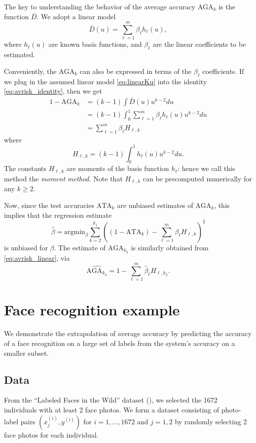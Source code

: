 \documentclass[twoside,11pt]{article}
\newcommand{\argmin}{\text{argmin}}
\begin{document}
The key to understanding the behavior of the average accuracy $\text{AGA}_k$ is the function $\bar{D}$.  
We adopt a linear model
\begin{equation}\label{eq:linearKu}
\bar{D}(u) = \sum_{\ell = 1}^m \beta_\ell h_\ell(u),
\end{equation}
where $h_\ell(u)$ are known basis functions, and $\beta_\ell$ are the linear coefficients to be estimated. 

Conveniently, the $\text{AGA}_k$ can also be expressed in terms of the $\beta_\ell$ coefficients.
If we plug in the assumed linear model \eqref{eq:linearKu} into the
identity \eqref{eq:avrisk_identity}, then we get
\begin{align}
1 - \text{AGA}_k &= (k-1)\int \bar{D}(u) u^{k-2} du
\\&= (k-1)\int_0^1 \sum_{\ell = 1}^m \beta_\ell h_\ell(u) u^{k-2} du
\\&= \sum_{\ell = 1}^m \beta_\ell H_{\ell,k} \label{eq:avrisk_linear}
\end{align}
where
\begin{equation}
H_{\ell,k} = (k-1) \int_0^1 h_\ell(u) u^{k-2} du.
\end{equation}
The constants $H_{\ell, k}$ are moments of the basis function
$h_\ell$: hence we call this method the \emph{moment method.}  Note
that $H_{\ell, k}$ can be precomputed numerically for any $k \geq 2$.

Now, since the test accuracies $\text{ATA}_k$ are unbiased estimates of
$\text{AGA}_{k}$, this implies that the regression
estimate
\[
\hat{\beta} = \argmin_\beta \sum_{k=2}^{k_1} \left( (1 - \text{ATA}_k) - \sum_{\ell=1}^m \beta_\ell H_{\ell, k}\right)^2
\]
is unbiased for $\beta$. The estimate of $\text{AGA}_{k_2}$ is similarly obtained
from \eqref{eq:avrisk_linear}, via
\begin{equation}\label{eq:avrisk_hat}
\widehat{\text{AGA}_{k_2}} = 1 - \sum_{\ell=1}^m \hat{\beta}_\ell H_{\ell, k_2}.
\end{equation}

\section{Face recognition example}\label{sec:extrapolation_example}

We demonstrate the extrapolation of average accuracy by predicting  the accuracy of a face recognition on a large set of labels from the system's accuracy on a smaller subset. 

\subsection{Data}
From the ``Labeled Faces in the Wild'' dataset (\cite{LFWTech}), we
selected the 1672 individuals with at least 2 face photos.  We form a
dataset consisting of photo-label pairs $(x_j^{(i)}, y^{(i)})$
for $i = 1,\hdots, 1672$ and $j = 1,2$ by randomly selecting 2 face
photos for each individual. 
\end{document}
